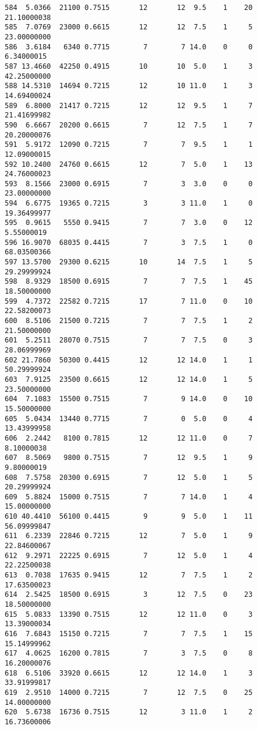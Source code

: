 \documentclass[
  letterpaper,
  DIV=11,
  numbers=noendperiod]{scrreprt}
\begin{document}
\begin{verbatim}
584  5.0366  21100 0.7515       12       12  9.5    1    20 21.10000038
585  7.0769  23000 0.6615       12       12  7.5    1     5 23.00000000
586  3.6184   6340 0.7715        7        7 14.0    0     0  6.34000015
587 13.4660  42250 0.4915       10       10  5.0    1     3 42.25000000
588 14.5310  14694 0.7215       12       10 11.0    1     3 14.69400024
589  6.8000  21417 0.7215       12       12  9.5    1     7 21.41699982
590  6.6667  20200 0.6615        7       12  7.5    1     7 20.20000076
591  5.9172  12090 0.7215        7        7  9.5    1     1 12.09000015
592 10.2400  24760 0.6615       12        7  5.0    1    13 24.76000023
593  8.1566  23000 0.6915        7        3  3.0    0     0 23.00000000
594  6.6775  19365 0.7215        3        3 11.0    1     0 19.36499977
595  0.9615   5550 0.9415        7        7  3.0    0    12  5.55000019
596 16.9070  68035 0.4415        7        3  7.5    1     0 68.03500366
597 13.5700  29300 0.6215       10       14  7.5    1     5 29.29999924
598  8.9329  18500 0.6915        7        7  7.5    1    45 18.50000000
599  4.7372  22582 0.7215       17        7 11.0    0    10 22.58200073
600  8.5106  21500 0.7215        7        7  7.5    1     2 21.50000000
601  5.2511  28070 0.7515        7        7  7.5    0     3 28.06999969
602 21.7860  50300 0.4415       12       12 14.0    1     1 50.29999924
603  7.9125  23500 0.6615       12       12 14.0    1     5 23.50000000
604  7.1083  15500 0.7515        7        9 14.0    0    10 15.50000000
605  5.0434  13440 0.7715        7        0  5.0    0     4 13.43999958
606  2.2442   8100 0.7815       12       12 11.0    0     7  8.10000038
607  8.5069   9800 0.7515        7       12  9.5    1     9  9.80000019
608  7.5758  20300 0.6915        7       12  5.0    1     5 20.29999924
609  5.8824  15000 0.7515        7        7 14.0    1     4 15.00000000
610 40.4410  56100 0.4415        9        9  5.0    1    11 56.09999847
611  6.2339  22846 0.7215       12        7  5.0    1     9 22.84600067
612  9.2971  22225 0.6915        7       12  5.0    1     4 22.22500038
613  0.7038  17635 0.9415       12        7  7.5    1     2 17.63500023
614  2.5425  18500 0.6915        3       12  7.5    0    23 18.50000000
615  5.0833  13390 0.7515       12       12 11.0    0     3 13.39000034
616  7.6843  15150 0.7215        7        7  7.5    1    15 15.14999962
617  4.0625  16200 0.7815        7        3  7.5    0     8 16.20000076
618  6.5106  33920 0.6615       12       12 14.0    1     3 33.91999817
619  2.9510  14000 0.7215        7       12  7.5    0    25 14.00000000
620  5.6738  16736 0.7515       12        3 11.0    1     2 16.73600006

\end{verbatim}
\end{document}
